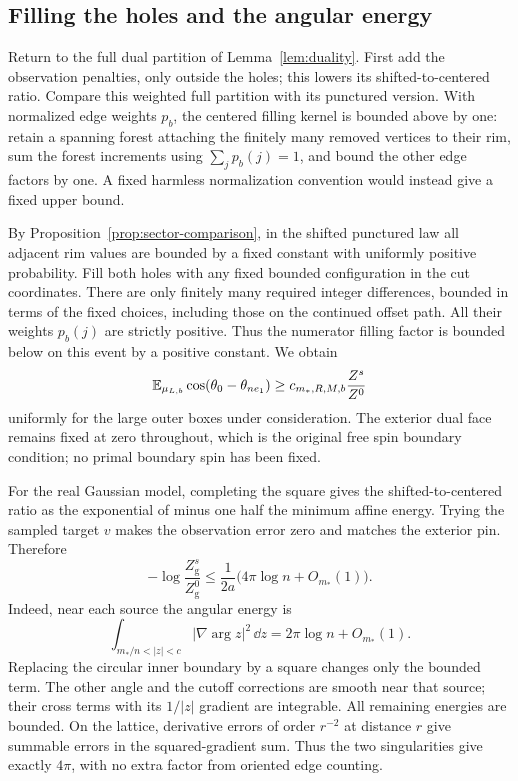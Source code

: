 \subsection{Filling the holes and the angular energy}

Return to the full dual partition of Lemma~\ref{lem:duality}.
First add the observation penalties, only outside the holes;
this lowers its shifted-to-centered ratio. Compare this
weighted full partition with its punctured version. With
normalized edge weights \(p_b\), the centered filling kernel
is bounded above by one: retain a spanning forest attaching
the finitely many removed vertices to their rim, sum the
forest increments using \(\sum_jp_b(j)=1\), and bound the
other edge factors by one. A fixed harmless normalization
convention would instead give a fixed upper bound.

By Proposition~\ref{prop:sector-comparison}, in the shifted
punctured law all adjacent rim values are bounded by a
fixed constant with uniformly positive probability.
Fill both holes with any fixed bounded configuration in
the cut coordinates. There are only finitely many required
integer differences, bounded in terms of the fixed choices,
including those on the continued offset path. All their
weights \(p_b(j)\) are strictly positive. Thus the numerator
filling factor is bounded below on this event by a positive
constant. We obtain
\begin{equation}\label{eq:magnetic-fill}
 \mathbb E_{\mu_{L,b}}\cos(\theta_0-\theta_{ne_1})
                         \ge c_{m_*,R,M,b}\frac{Z^s}{Z^0}
\end{equation}
uniformly for the large outer boxes under consideration.
The exterior dual face remains fixed at zero throughout,
which is the original free spin boundary condition; no
primal boundary spin has been fixed.

For the real Gaussian model, completing the square gives
the shifted-to-centered ratio as the exponential of minus
one half the minimum affine energy. Trying the sampled
target \(v\) makes the observation error zero and matches
the exterior pin. Therefore
\begin{equation}\label{eq:magnetic-energy}
 -\log\frac{Z_{\mathrm g}^s}{Z_{\mathrm g}^0}
       \le \frac1{2a}\bigl(4\pi\log n+O_{m_*}(1)\bigr).
\end{equation}
Indeed, near each source the angular energy is
\[
 \int_{m_*/n<|z|<c}|\nabla\arg z|^2\,\dd z
                        =2\pi\log n+O_{m_*}(1).
\]
Replacing the circular inner boundary by a square changes
only the bounded term. The other angle and the cutoff
corrections are smooth near that source; their cross terms
with its \(1/|z|\) gradient are integrable. All remaining
energies are bounded. On the lattice, derivative errors
of order \(r^{-2}\) at distance \(r\) give summable errors
in the squared-gradient sum. Thus the two singularities
give exactly \(4\pi\), with no extra factor from oriented
edge counting.

